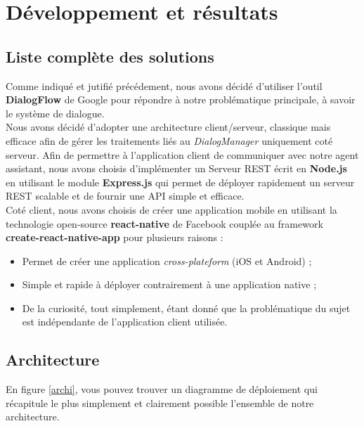 \chapter{Développement et résultats}

\section{Liste complète des solutions}

Comme indiqué et jutifié précédement, nous avons décidé d'utiliser l'outil \textbf{DialogFlow} de Google\cite{dialogflow} pour répondre à notre problématique principale, à savoir 
le système de dialogue.\\

Nous avons décidé d'adopter une architecture client/serveur, classique mais efficace afin de gérer les traitements liés au \emph{DialogManager} uniquement coté serveur. Afin 
de permettre à l'application client de communiquer avec notre agent assistant, nous avons choisis d'implémenter un Serveur REST écrit en \textbf{Node.js}\cite{node} en
utilisant le module \textbf{Express.js}\cite{express} qui permet de déployer rapidement un serveur REST scalable et de fournir une API simple et efficace.\\

Coté client, nous avons choisis de créer une application mobile en utilisant la technologie open-source \textbf{react-native}\cite{reactnative} de Facebook couplée 
au framework \textbf{create-react-native-app}\cite{createnative} pour plusieurs raisons : 
\begin{itemize}
    \item Permet de créer une application \emph{cross-plateform} (iOS et Android) ;
    \item Simple et rapide à déployer contrairement à une application native ;
    \item De la curiosité, tout simplement, étant donné que la problématique du sujet est indépendante de l'application client utilisée.
\end{itemize}

\section{Architecture}

En figure \ref{archi}, vous pouvez trouver un diagramme de déploiement qui récapitule le plus simplement et clairement possible l'ensemble de notre architecture.

